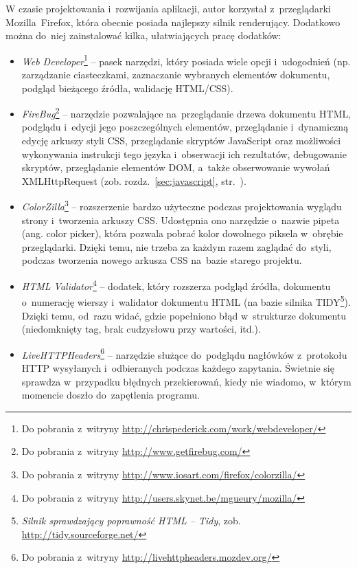 \documentclass[a4paper,12pt,oneside]{report}
\begin{document}
W czasie projektowania i~rozwijania aplikacji, autor korzystał z~przeglądarki Mozilla~Firefox, która obecnie posiada najlepszy silnik renderujący. Dodatkowo można do~niej zainstalować kilka, ułatwiających pracę dodatków:
\begin{itemize}
  \item \emph{Web Developer}\footnote{Do pobrania z~witryny \url{http://chrispederick.com/work/webdeveloper/}} -- pasek narzędzi, który posiada wiele opcji i~udogodnień (np. zarządzanie ciasteczkami, zaznaczanie wybranych elementów dokumentu, podgląd bieżącego źródła, walidację HTML/CSS).
  \item \emph{FireBug}\footnote{Do pobrania z~witryny \url{http://www.getfirebug.com/}} -- narzędzie pozwalające na~przeglądanie drzewa dokumentu HTML, podglądu i~edycji jego poszczególnych elementów, przeglądanie i~dynamiczną edycję arkuszy styli CSS, przeglądanie skryptów JavaScript oraz możliwości wykonywania instrukcji tego języka i~obserwacji ich rezultatów, debugowanie skryptów, przeglądanie elementów DOM, a~także obserwowanie wywołań XMLHttpRequest (zob. rozdz.~\ref{sec:javascript}, str.~\pageref{sec:javascript}).
  \item \emph{ColorZilla}\footnote{Do pobrania z~witryny \url{http://www.iosart.com/firefox/colorzilla/}} -- rozszerzenie bardzo użyteczne podczas projektowania wyglądu strony i~tworzenia arkuszy CSS. Udostępnia ono narzędzie o~nazwie pipeta (ang. color picker), która pozwala pobrać kolor dowolnego piksela w~obrębie przeglądarki. Dzięki temu, nie trzeba za każdym razem zaglądać do~styli, podczas tworzenia nowego arkusza CSS na~bazie starego projektu.
  \item \emph{HTML Validator}\footnote{Do pobrania z~witryny \url{http://users.skynet.be/mgueury/mozilla/}} -- dodatek, który rozszerza podgląd źródła, dokumentu o~numerację wierszy i~walidator dokumentu HTML (na bazie silnika TIDY\footnote{\emph{Silnik sprawdzający poprawność HTML -- Tidy}, zob. \url{http://tidy.sourceforge.net/}}). Dzięki temu, od~razu widać, gdzie popełniono błąd w~strukturze dokumentu (niedomknięty tag, brak cudzysłowu przy wartości, itd.).
  \item \emph{LiveHTTPHeaders}\footnote{Do pobrania z~witryny \url{http://livehttpheaders.mozdev.org/}} -- narzędzie służące do~podglądu nagłówków z~protokołu HTTP wysyłanych i~odbieranych podczas każdego zapytania. Świetnie się sprawdza w~przypadku błędnych przekierowań, kiedy nie wiadomo, w~którym momencie doszło do~zapętlenia programu.
\end{itemize}
\end{document}
